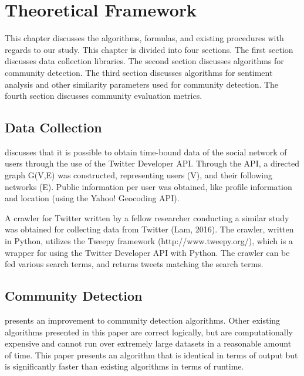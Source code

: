 %
%
%                 


\chapter{Theoretical Framework}
\label{sec:theoframe}


This chapter discusses the algorithms, formulas, and existing procedures with regards to our study. This chapter is divided into four sections. The first section discusses data collection libraries. The second section discusses algorithms for community detection. The third section discusses algorithms for sentiment analysis and other similarity parameters used for community detection. The fourth section discusses community evaluation metrics.


\section{Data Collection}

 discusses that it is possible to obtain time-bound data of the social network of users through the use of the Twitter Developer API. Through the API, a directed graph G(V,E) was constructed, representing users (V), and their following networks (E). Public information per user was obtained, like profile information and location (using the Yahoo! Geocoding API). 

A crawler for Twitter written by a fellow researcher conducting a similar study was obtained for collecting data from Twitter (Lam, 2016). The crawler, written in Python, utilizes the Tweepy framework (http://www.tweepy.org/), which is a wrapper for using the Twitter Developer API with Python. The crawler can be fed various search terms, and returns tweets matching the search terms.

\section{Community Detection}
\label{sec:commdet}


 presents an improvement to community detection algorithms. Other existing algorithms presented in this paper are correct logically, but are computationally expensive and cannot run over extremely large datasets in a reasonable amount of time. This paper presents an algorithm that is identical in terms of output but is significantly faster than existing algorithms in terms of runtime.


